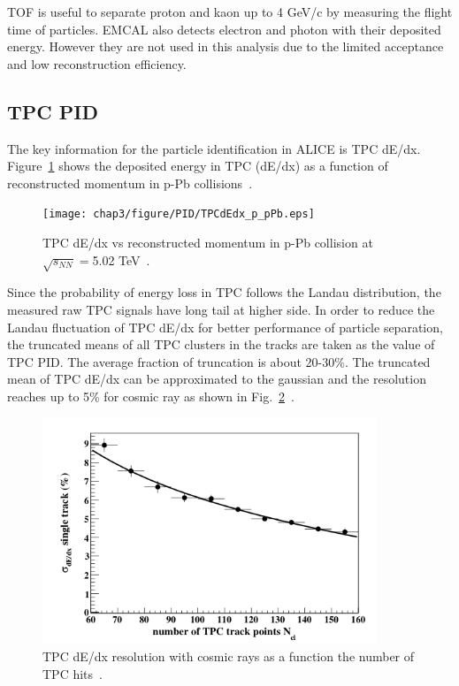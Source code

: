 TOF is useful to separate proton and kaon up to 4 GeV/c by measuring the flight time of particles. 
EMCAL also detects electron and photon with their deposited energy. 
However they are not used in this analysis due to the limited acceptance and low reconstruction efficiency. 

\subsection{TPC PID}
The key information for the particle identification in ALICE is TPC dE/dx. 
Figure~\ref{fig_3_tpcpid} shows the deposited energy in TPC (dE/dx) as a function of reconstructed momentum in p-Pb collisions~\cite{bib_aprrun1}.
\begin{figure}[!h]
  \centering
  \texttt{[image: chap3/figure/PID/TPCdEdx\_p\_pPb.eps]}
  \caption{TPC dE/dx vs reconstructed momentum in p-Pb collision at $\sqrt{s_{NN}}=$5.02 TeV~\cite{bib_aprrun1}.}
  \label{fig_3_tpcpid}
\end{figure}
Since the probability of energy loss in TPC follows the Landau distribution, the measured raw TPC signals have long tail at higher side.
In order to reduce the Landau fluctuation of TPC dE/dx for better performance of particle separation, the truncated means of all TPC clusters in the tracks are taken as the value of TPC PID.
The average fraction of truncation is about 20-30\%.  
The truncated mean of TPC dE/dx can be approximated to the gaussian and the resolution reaches up to 5\% for cosmic ray as shown in Fig.~\ref{fig_3_tpcpidreso}~\cite{bib_tpcreso}. 
\begin{figure}[!h]
  \centering
  \includegraphics[width=10cm]{chap3/figure/TPC/TPCdEdx_resolution.png}
  \caption{TPC dE/dx resolution with cosmic rays as a function the number of TPC hits~\cite{bib_tpcreso}. }
  \label{fig_3_tpcpidreso}
\end{figure}

